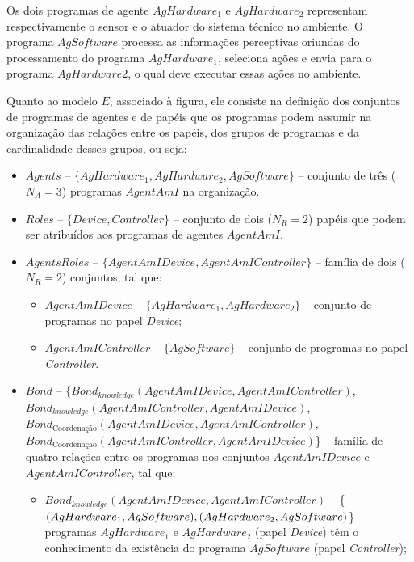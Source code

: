 Os dois programas de agente $AgHardware_1$ e $AgHardware_2$ representam respectivamente o sensor e o atuador do sistema técnico no ambiente. O programa $AgSoftware$ processa as informações perceptivas oriundas do processamento do programa $AgHardware_1$, seleciona ações e envia para o programa $AgHardware2$, o qual deve executar essas ações no ambiente.

Quanto ao modelo $E$, associado à figura, ele consiste na definição dos conjuntos de programas de agentes e de papéis que os programas podem assumir na organização das relações entre os papéis, dos grupos de programas e da cardinalidade desses grupos, ou seja: 

\begin{itemize}
    \item $Agents$ --	$\{AgHardware_1, AgHardware_2, AgSoftware\}$ – conjunto de três ($N_A = 3$) programas $AgentAmI$ na organização.
    
    \item $Roles$ -- $\{Device, Controller\}$ – conjunto de dois ($N_R = 2$) papéis que podem ser atribuídos aos programas de agentes $AgentAmI$.
    
    \item $AgentsRoles$ -- $\{AgentAmIDevice, AgentAmIController\}$ – família de dois ($N_R = 2$) conjuntos, tal que:
    
    \begin{itemize}
        \item $AgentAmIDevice$ -- $\{AgHardware_1, AgHardware_2\}$ – conjunto de programas no papel \textit{Device};
        \item $AgentAmIController$ -- $\{AgSoftware\}$ – conjunto de programas no papel \textit{Controller}.
    \end{itemize}
    
    \item $Bond$ -- \{$Bond_{knowledge}(AgentAmIDevice, AgentAmIController)$, 
                    \\$Bond_{knowledge}(AgentAmIController, AgentAmIDevice)$,
                    \\$Bond_{\textrm{Coordenação}}(AgentAmIDevice, AgentAmIController)$, 
                    \\$Bond_{\textrm{Coordenação}}(AgentAmIController, AgentAmIDevice)$\} – família de quatro relações entre os programas nos conjuntos $AgentAmIDevice$ e $AgentAmIController$, tal que:
    \begin{itemize}
        
        \item $Bond_{knowledge}(AgentAmIDevice, AgentAmIController)$ --	\{$(AgHardware_1, AgSoftware), \\(AgHardware_2, AgSoftware)$\} – programas $AgHardware_1$ e $AgHardware_2$ (papel \textit{Device}) têm o conhecimento da existência do programa $AgSoftware$ (papel \textit{Controller});
        

\end{itemize}
\end{itemize}
